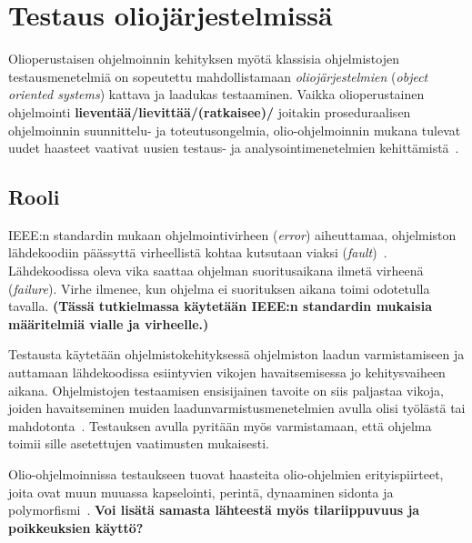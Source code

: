 \documentclass[finnish, grading]{tktltiki2}
\theoremstyle{definition}
\theoremstyle{remark}
\begin{document}


\section{Testaus oliojärjestelmissä}

Olioperustaisen ohjelmoinnin kehityksen myötä klassisia ohjelmistojen testausmenetelmiä on sopeutettu mahdollistamaan \textit{oliojärjestelmien} (\textit{object oriented systems}) kattava ja laadukas testaaminen. Vaikka olioperustainen ohjelmointi \textbf{lieventää/lievittää/(ratkaisee)/} joitakin proseduraalisen ohjelmoinnin suunnittelu- ja toteutusongelmia, olio-ohjelmoinnin mukana tulevat uudet haasteet vaativat uusien testaus- ja analysointimenetelmien kehittämistä~\cite[s. 86]{Mariani:Pezze:2008}. 

\subsection{Rooli}

IEEE:n standardin mukaan ohjelmointivirheen (\textit{error}) aiheuttamaa, ohjelmiston lähdekoodiin päässyttä virheellistä kohtaa kutsutaan viaksi (\textit{fault})~\cite[s. 5]{IEEE:2009}. Lähdekoodissa oleva vika saattaa ohjelman suoritusaikana ilmetä virheenä (\textit{failure}). Virhe ilmenee, kun ohjelma ei suorituksen aikana toimi odotetulla tavalla. \textbf{(Tässä tutkielmassa käytetään IEEE:n standardin mukaisia määritelmiä vialle ja virheelle.)}

Testausta käytetään ohjelmistokehityksessä ohjelmiston laadun varmistamiseen ja auttamaan lähdekoodissa esiintyvien vikojen havaitsemisessa jo kehitysvaiheen aikana. Ohjelmistojen testaamisen ensisijainen tavoite on siis paljastaa vikoja, joiden havaitseminen muiden laadunvarmistusmenetelmien avulla olisi työlästä tai mahdotonta~\cite[s. 59]{Binder:1999}. Testauksen avulla pyritään myös varmistamaan, että ohjelma toimii sille asetettujen vaatimusten mukaisesti. %

Olio-ohjelmoinnissa testaukseen tuovat haasteita olio-ohjelmien erityispiirteet, joita ovat muun muuassa kapselointi, perintä, dynaaminen sidonta ja polymorfismi~\cite[s. 86]{Mariani:Pezze:2008}. \textbf{Voi lisätä samasta lähteestä myös tilariippuvuus ja poikkeuksien käyttö?}
\end{document}
